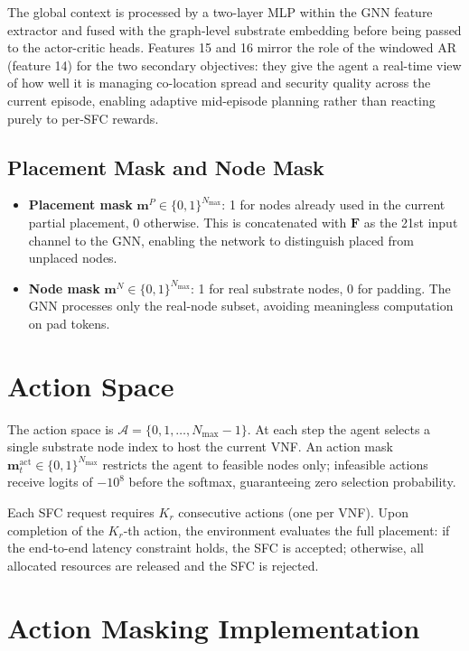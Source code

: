The global context is processed by a two-layer MLP within the GNN feature extractor and fused with the graph-level substrate embedding before being passed to the actor-critic heads. Features 15 and 16 mirror the role of the windowed AR (feature 14) for the two secondary objectives: they give the agent a real-time view of how well it is managing co-location spread and security quality across the current episode, enabling adaptive mid-episode planning rather than reacting purely to per-SFC rewards.

\subsection{Placement Mask and Node Mask}

\begin{itemize}
  \item \textbf{Placement mask} $\mathbf{m}^P \in \{0,1\}^{N_{\max}}$: 1 for nodes already used in the current partial placement, 0 otherwise. This is concatenated with $\mathbf{F}$ as the 21st input channel to the GNN, enabling the network to distinguish placed from unplaced nodes.
  \item \textbf{Node mask} $\mathbf{m}^N \in \{0,1\}^{N_{\max}}$: 1 for real substrate nodes, 0 for padding. The GNN processes only the real-node subset, avoiding meaningless computation on pad tokens.
\end{itemize}

\section{Action Space}

The action space is $\mathcal{A} = \{0, 1, \ldots, N_{\max} - 1\}$. At each step the agent selects a single substrate node index to host the current VNF. An action mask $\mathbf{m}_t^{\text{act}} \in \{0,1\}^{N_{\max}}$ restricts the agent to feasible nodes only; infeasible actions receive logits of $-10^8$ before the softmax, guaranteeing zero selection probability.

Each SFC request requires $K_r$ consecutive actions (one per VNF). Upon completion of the $K_r$-th action, the environment evaluates the full placement: if the end-to-end latency constraint holds, the SFC is accepted; otherwise, all allocated resources are released and the SFC is rejected.

\section{Action Masking Implementation}

